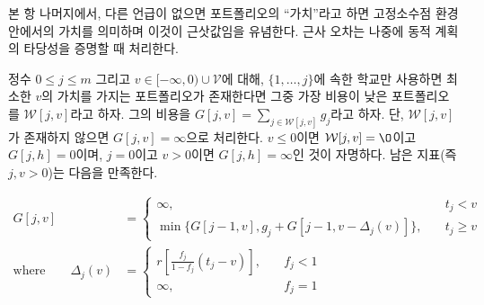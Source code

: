 \documentclass[11pt]{article} %
\newif\ifen
\theoremstyle{definition}
\theoremstyle{definition}
\begin{document}
\ifen
For the remainder of this subsection, unless otherwise specified, the word \emph{valuation} refers to a portfolio’s valuation within the fixed-point framework, with the understanding that this is an approximation. We will account for the approximation error below when we prove the dynamic program’s validity. 
\else
본 항 나머지에서, 다른 언급이 없으면 포트폴리오의 ``가치''라고 하면 고정소수점 환경 안에서의 가치를 의미하며 이것이 근삿값임을 유념한다. 근사 오차는 나중에 동적 계획의 타당성을 증명할 때 처리한다.
\fi

\ifen
For integers $0 \leq j \leq m$ and $v \in [-\infty, 0) \cup \mathcal{V}$, let $\mathcal{W}[j, v]$ denote the least expensive portfolio that uses only schools $\{ 1, \dots, j\}$ and has valuation at least $v$, if such a portfolio exists. Denote its cost by $G[j, v] = \sum_{j\in \mathcal{W}[j, v]} g_j$, where $G[j, v] = \infty$ if $\mathcal{W}[j, v]$ does not exist. It is clear that if $v \leq 0$, then $\mathcal{W}[j, v] = \O$ and $G[j, h] = 0$, and that if $j = 0$ and $v > 0$, then $G[j, h] = \infty$.  For the remaining indices (where $j, v > 0$), we claim that
\else
정수 $0 \leq j \leq m$ 그리고 $v \in [-\infty, 0) \cup \mathcal{V}$에 대해, $\{ 1, \dots, j\}$에 속한 학교만 사용하면 최소한 $v$의 가치를 가지는 포트폴리오가 존재한다면 그중 가장 비용이 낮은 포트폴리오를  $\mathcal{W}[j, v]$라고 하자. 그의 비용을 $G[j, v] = \sum_{j\in \mathcal{W}[j, v]} g_j$라고 하자. 단, $\mathcal{W}[j, v]$가 존재하지 않으면 $G[j, v] = \infty$으로 처리한다. $v \leq 0$이면 $\mathcal{W}[j, v] = \O$이고 $G[j, h] = 0$이며, $j = 0$이고 $v > 0$이면 $G[j, h] = \infty$인 것이 자명하다. 남은 지표(즉 $j, v > 0$)는 다음을 만족한다.
\fi
\begin{align} \label{recursionrelationforcostmindp}
G[j, v] &=
\begin{cases}
\infty, \quad & t_j < v \\
\min\bigl\{G[j-1, v], g_j + G[j-1, v - \Delta_j(v)] \bigr\}, \quad & t_j \geq v 
\end{cases}\\
\text{where}\qquad
\Delta_j (v) &= 
\begin{cases}
r\left[\frac{f_j}{1 - f_j} (t_j - v)\right], \quad & f_j < 1\\
\infty, &f_j = 1\ifen.\fi
\end{cases} \label{deltajvdef}
\end{align}
\end{document}
